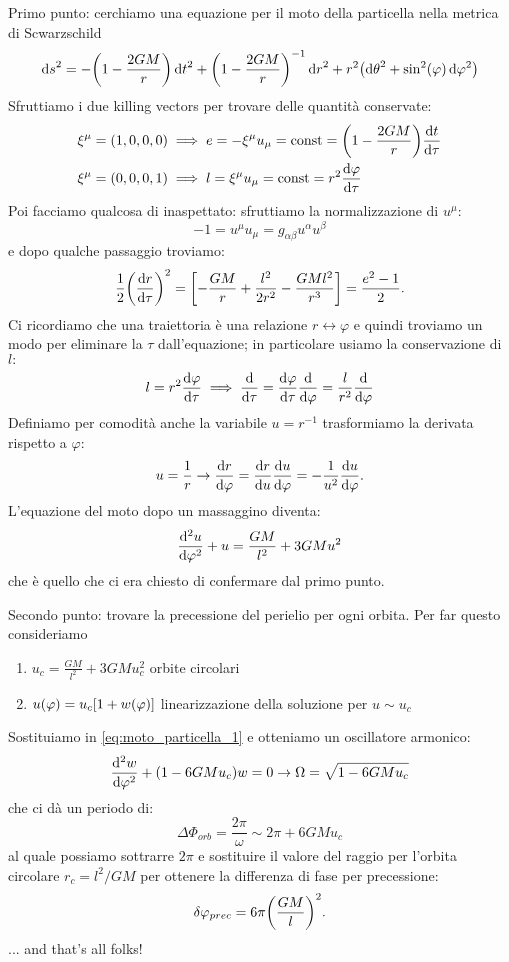 \documentclass[a4paper]{article}
\renewcommand{\phi}{\varphi}
\begin{document}
Primo punto: cerchiamo una equazione per il moto della particella nella metrica di Scwarzschild
\[
\dd{s}^2 = -\pqty{1-\frac{2GM}{r}} \dd{t}^2 + \pqty{1-\frac{2GM}{r}}^{-1} \dd{r}^2 + r^2\pqty{\dd{\theta}^2 + \sin^2(\varphi)\dd{\varphi^2}}
\]
Sfruttiamo i due killing vectors per trovare delle quantit\`a conservate:
\begin{align*}
\xi^\mu = (1,0,0,0) &\implies e= -\xi^\mu u_\mu = \text{const} = \pqty{1-\frac{2GM}{r}}\dv{t}{\tau} \\
\xi^\mu = (0,0,0,1) &\implies l= \xi^\mu u_\mu = \text{const} = r^2 \dv{\phi}{\tau} 
\end{align*}
Poi facciamo qualcosa di inaspettato: sfruttiamo la normalizzazione di $u^\mu:$\[ -1=u^\mu u_\mu  = g_{\alpha\beta}u^\alpha u^\beta\] e dopo qualche passaggio troviamo:
\begin{equation}
\frac{1}{2}\pqty{\dv{r}{\tau}}^2 = \bqty{-\frac{GM}{r} + \frac{l^2}{2r^2}-\frac{GMl^2}{r^3}} = \frac{e^2 -1}{2}.\label{eq:moto_particella}
\end{equation}
Ci ricordiamo che una traiettoria \`e una relazione $r\leftrightarrow\phi$ e quindi troviamo un modo per eliminare la $\tau$ dall'equazione; in particolare usiamo la conservazione di $l:$ \[l=r^2\dv{\phi}{\tau} \implies\dv{}{\tau} = \dv{\phi}{\tau}\dv{}{\phi} = \frac{l}{r^2}\dv{}{\phi}\]
Definiamo per comodit\`a anche la variabile $u=r^{-1}$ trasformiamo la derivata rispetto a $\phi:$\[u=\frac{1}{r} \rightarrow \dv{r}{\phi} =\dv{r}{u}\dv{u}{\phi} = -\frac{1}{u^2}\dv{u}{\phi}. \]
L'equazione del moto dopo un massaggino diventa:
\begin{equation} \dv[2]{u}{\phi} + u = \frac{GM}{l^2}+3GMu^2 \label{eq:moto_particella_1}\end{equation} che \`e quello che ci era chiesto di confermare dal primo punto.

Secondo punto: trovare la precessione del perielio per ogni orbita. Per far questo consideriamo
\begin{enumerate}
  \item $u_c = \frac{GM}{l^2}+3GMu_c^2$ orbite circolari
  \item $u(\phi)=u_c\bqty{1+w(\phi)}$ linearizzazione della soluzione per $u\sim u_c$
\end{enumerate}
Sostituiamo in \ref{eq:moto_particella_1} e otteniamo un oscillatore armonico:
\[\dv[2]{w}{\phi} + \pqty{1-6GMu_c}w=0 \rightarrow \Omega = \sqrt{1-6GMu_c} \]
che ci d\`a un periodo di:\[\Delta\Phi_{orb}=\frac{2\pi}{\omega} \sim 2\pi +6GM u_c\] al quale possiamo sottrarre $2\pi$ e sostituire il valore del raggio per l'orbita circolare $r_c=l^2/GM$ per ottenere la differenza di fase per precessione:\[ \delta\phi_{prec}=6\pi\pqty{\frac{GM}{l}}^2.\]
... and that's all folks!
\end{document}
